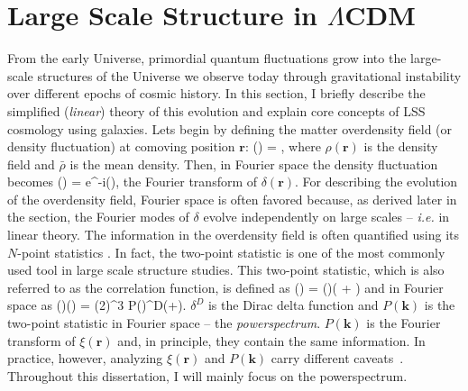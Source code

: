 

\section{Large Scale Structure in $\Lambda$CDM} \label{sec:lss}
From the early Universe, primordial quantum fluctuations grow into the 
large-scale structures of the Universe we observe today through gravitational 
instability over different epochs of cosmic history. In this section, I briefly 
describe the simplified ({\em linear}) theory of this evolution and explain core 
concepts of LSS cosmology using galaxies. Lets begin by defining the matter 
overdensity field (or density fluctuation) at comoving position $\bm{r}$: 
\beq \label{eq:delta}
\delta() = , 
\eeq
where $\rho(\bm{r})$ is the density field and $\bar{\rho}$ is the mean 
density. Then, in Fourier space the density fluctuation becomes 
\beq
\delta() = \int {}\; e^{-i\cdot{}}\;\delta(),
\eeq
the Fourier transform of $\delta(\bm{r})$. 
For describing the evolution of the overdensity field, Fourier space is often 
favored because, as derived later in the section, the Fourier modes of 
$\delta$ evolve independently on large scales -- \emph{i.e.} in linear theory.
The information in the overdensity field is often quantified using its 
$N$-point statistics \citep{peebles80, Bernardeau:2002aa, DodelsonBook}. 
In fact, the two-point statistic is one of the most commonly used tool in 
large scale structure studies. This two-point statistic, which is also 
referred to as the correlation function, is defined as 
\beq
\xi() = \langle \delta()\delta( +  ) \rangle
\eeq
and in Fourier space as
\beq
\langle \delta()\delta() \rangle = (2\pi)^3 P()\;\delta^{D}(+).
\eeq
$\delta^{D}$ is the Dirac delta function and $P(\bm{k})$ is the two-point statistic in 
Fourier space -- the {\em powerspectrum}. $P(\bm{k})$ is the Fourier transform of 
$\xi(\bm{r})$ and, in principle, they contain the same information. 
In practice, however, analyzing $\xi(\bm{r})$ and $P(\bm{k})$ carry different 
caveats~\citep{Feldman:1994aa}. Throughout this dissertation, I will mainly focus 
on the powerspectrum. 

